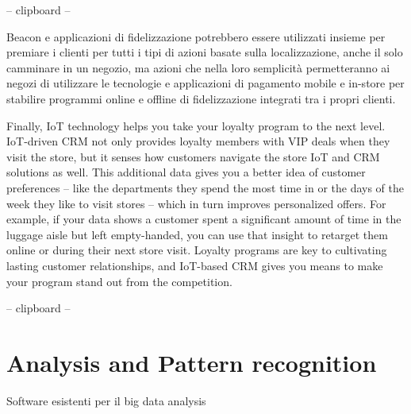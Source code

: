 -- clipboard --

Beacon e applicazioni di fidelizzazione potrebbero essere utilizzati insieme per premiare i clienti per tutti i tipi di azioni basate sulla localizzazione, anche il solo camminare in un negozio, ma azioni che nella loro semplicità permetteranno ai negozi di utilizzare le tecnologie e applicazioni di pagamento mobile e in-store per stabilire programmi online e offline di fidelizzazione integrati tra i propri clienti.

Finally, IoT technology helps you take your loyalty program to the next level. IoT-driven CRM not only provides loyalty members with VIP deals when they visit the store, but it senses how customers navigate the store IoT and CRM solutions as well. This additional data gives you a better idea of customer preferences – like the departments they spend the most time in or the days of the week they like to visit stores – which in turn improves personalized offers. For example, if your data shows a customer spent a significant amount of time in the luggage aisle but left empty-handed, you can use that insight to retarget them online or during their next store visit. Loyalty programs are key to cultivating lasting customer relationships, and IoT-based CRM gives you means to make your program stand out from the competition.

-- clipboard --

\section{Analysis and Pattern recognition}

Software esistenti per il big data analysis



